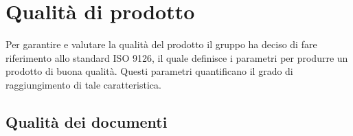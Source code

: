\section{Qualità di prodotto}
	Per garantire e valutare la qualità del prodotto il gruppo ha deciso di fare riferimento allo standard ISO 9126, il quale definisce i parametri per produrre un prodotto di buona qualità. Questi parametri quantificano il grado di raggiungimento di tale caratteristica.
%		
%		
%		
%		
%		
	\subsection{Qualità dei documenti}
		
